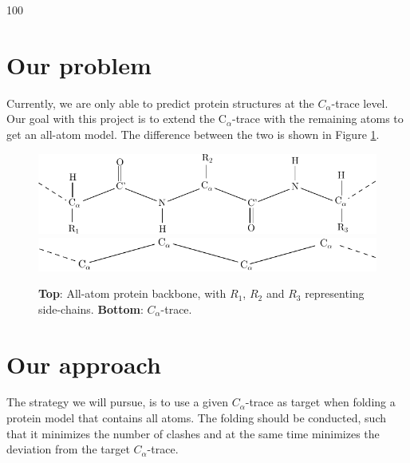 \documentclass[a0,portrait]{a0poster}
\newcommand{\Ca}{C$_{\alpha}${}}
\begin{document}
\begin{GridBlock}{0}{21}{100}
\begin{multicols}{3}



\section{Our problem}
Currently, we are only able to predict protein structures at the $C_\alpha$-trace level. 
Our goal with this project is to extend the \Ca-trace with the remaining atoms to get an all-atom model.
The difference between the two is shown in Figure \ref{fig:all-atom_vs_trace}.

\begin{figure}
  \centering
  \vspace{1cm}
  \includegraphics[width=0.65\columnwidth]{../rapport/figures/amino_connect}  
  \\[1cm]
  \includegraphics[width=0.65\columnwidth]{../rapport/figures/Calpha_backbone}
  \caption{\textbf{Top}: All-atom protein backbone, with $R_1$, $R_2$ and $R_3$ representing side-chains. \textbf{Bottom}: $C_{\alpha}$-trace. }
  \label{fig:all-atom_vs_trace}
\end{figure}

\section{Our approach}
The strategy we will pursue, is to use a given $C_\alpha$-trace as target when folding a protein model that contains all atoms. The folding should be conducted, such that it minimizes the number of clashes and at the same time minimizes the deviation from the target $C_\alpha$-trace.


\end{multicols}
\end{GridBlock}
\end{document}

